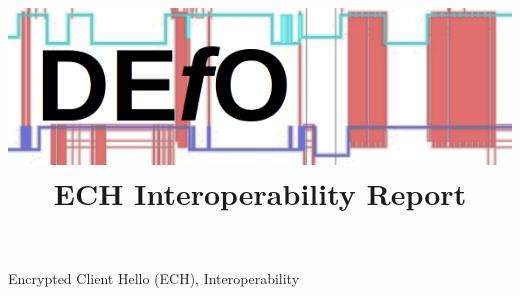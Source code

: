 \documentclass[12pt,draftclsnofoot,onecolumn]{IEEEtran}
\begin{document}

\title{
\includegraphics[width=\textwidth]{defologo.png}
ECH Interoperability Report
}

\author{
}





\maketitle



\begin{IEEEkeywords}
Encrypted Client Hello (ECH), Interoperability
\end{IEEEkeywords}











\end{document}
